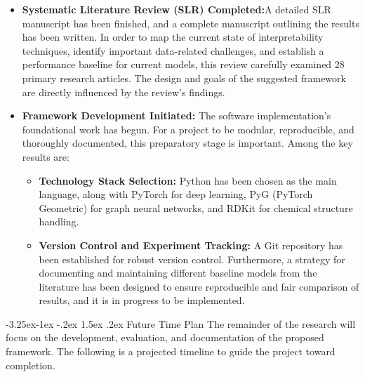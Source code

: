 \documentclass[12pt,a4paper]{article}
\makeatletter
\renewcommand\subsection{\@startsection{subsection}{2}{\z@}%
  {-3.25ex\@plus-1ex \@minus-.2ex}%
  {1.5ex \@plus.2ex}%
  {\normalfont\normalsize\bfseries}}
\makeatother
\begin{document}
\begin{itemize}
    \item \textbf{Systematic Literature Review (SLR) Completed:}A detailed SLR manuscript has been finished, and a complete manuscript outlining the results has been written.  In order to map the current state of interpretability techniques, identify important data-related challenges, and establish a performance baseline for current models, this review carefully examined 28 primary research articles.  The design and goals of the suggested framework are directly influenced by the review's findings.

    \item \textbf{Framework Development Initiated:} The software implementation's foundational work has begun. For a project to be modular, reproducible, and thoroughly documented, this preparatory stage is important. Among the key results are:
    \begin{itemize}
        \item \textbf{Technology Stack Selection:} Python has been chosen as the main language, along with PyTorch for deep learning, PyG (PyTorch Geometric) for graph neural networks, and RDKit for chemical structure handling.
        \item \textbf{Version Control and Experiment Tracking:} A Git repository has been established for robust version control. Furthermore, a strategy for documenting and maintaining different baseline models from the literature has been designed to ensure reproducible and fair comparison of results, and it is in progress to be implemented.
    \end{itemize}
\end{itemize}

\subsection{Future Time Plan}
The remainder of the research will focus on the development, evaluation, and documentation of the proposed framework. The following is a projected timeline to guide the project toward completion.
\end{document}
